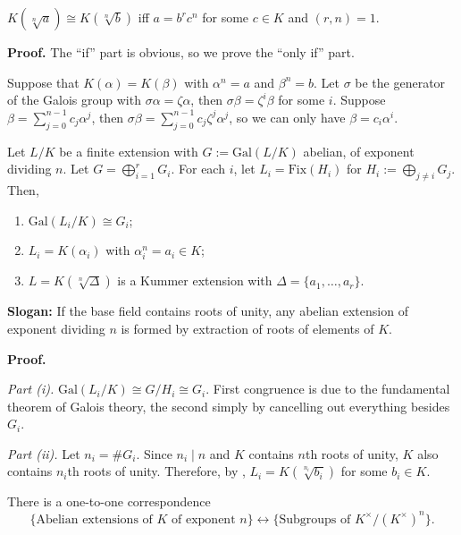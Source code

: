 \documentclass{template}
\begin{document}
\begin{lemma}
    $K(\sqrt[n]{a}) \cong K(\sqrt[n]{b})$ iff $a=b^rc^n$ for some $c \in K$
    and $(r,n)=1$.
\end{lemma}

\textbf{Proof.} The ``if'' part is obvious, so we prove the ``only if'' part.

Suppose that $K(\alpha)=K(\beta)$ with $\alpha^n=a$ and $\beta^n=b$. Let
$\sigma$ be the generator of the Galois group with $\sigma\alpha=\zeta\alpha$,
then $\sigma\beta=\zeta^i\beta$ for some $i$. Suppose
$\beta=\sum_{j=0}^{n-1}c_j\alpha^j$, then
$\sigma\beta=\sum_{j=0}^{n-1}c_j\zeta^j\alpha^j$, so we can only have
$\beta=c_i\alpha^i$.

\begin{lemma}\label{lemma:abelian-extensions} Let $L/K$ be a finite extension
    with $G:=\text{Gal}(L/K)$ abelian, of exponent dividing $n$. Let $G =
    \bigoplus_{i=1}^r G_i$. For each $i$, let $L_i=\text{Fix}(H_i)$ for
    $H_i := \bigoplus_{j \neq i} G_j$. Then,
    \begin{enumerate}
        \item[(i)] $\text{Gal}(L_i/K) \cong G_i$;
        \item[(ii)] $L_i = K(\alpha_i)$ with $\alpha_i^n = a_i \in K$;
        \item[(iii)] $L=K(\sqrt[n]{\Delta})$ is a Kummer extension with
        $\Delta=\{a_1,\dots,a_r\}$.  
    \end{enumerate}

    \textbf{Slogan:} If the base field contains roots of unity, any abelian
    extension of exponent dividing $n$ is formed by extraction of roots of
    elements of $K$.
\end{lemma}

\textbf{Proof.} 

\textit{Part (i).} $\text{Gal}(L_i/K) \cong G/H_i \cong G_i$. First congruence
is due to the fundamental theorem of Galois theory, the second simply by
cancelling out everything besides $G_i$.

\textit{Part (ii).} Let $n_i=\#G_i$. Since $n_i \mid n$ and $K$ contains $n$th
roots of unity, $K$ also contains $n_i$th roots of unity. Therefore, by
, $L_i=K(\sqrt[n_i]{b_i})$ for some $b_i \in K$. 


\begin{theorem}
    There is a one-to-one correspondence
    \begin{equation*}
        \{\text{Abelian extensions of $K$ of exponent $n$}\} \leftrightarrow \{\text{Subgroups of $K^{\times}/(K^{\times})^n$}\}.
    \end{equation*}    
\end{theorem}
\end{document}
